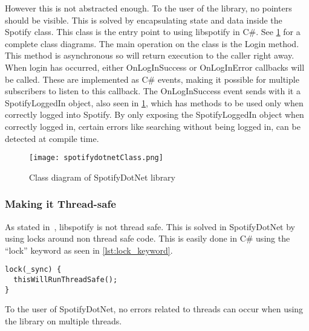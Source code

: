 However this is not abstracted enough. To the user of the library, no pointers should be visible. This is solved by encapsulating state and data inside the Spotify class. This class is the entry point to using libspotify in C\#. See \cref{fig:spotifydotnet_class} for a complete class diagrams. The main operation on the class is the Login method. This method is asynchronous so will return execution to the caller right away. When login has occurred, either OnLogInSuccess or OnLogInError callbacks will be called. These are implemented as C\# events, making it possible for multiple subscribers to listen to this callback. The OnLogInSuccess event sends with it a SpotifyLoggedIn object, also seen in \cref{fig:spotifydotnet_class}, which has methods to be used only when correctly logged into Spotify. By only exposing the SpotifyLoggedIn object when correctly logged in, certain errors like searching without being logged in, can be detected at compile time.

\begin{figure}
  \centering
  \texttt{[image: spotifydotnetClass.png]}
  \caption{Class diagram of SpotifyDotNet library}
  \label{fig:spotifydotnet_class}
\end{figure}

\subsubsection{Making it Thread-safe}
\label{ssub:making_it_thread_safe}

As stated in~\cite{spotifyLibspotifyFAQ}, libspotify is not thread safe. This is solved in SpotifyDotNet by using locks around non thread safe code. This is easily done in C\# using the \enquote{lock} keyword as seen in \cref{lst:lock_keyword}.

\begin{lstlisting}[caption = {Example of using the lock keyword in C\#. \enquote{\_sync} is an object used to store the lock state}, label = {lst:lock_keyword}]
lock(_sync) {
  thisWillRunThreadSafe();
}
\end{lstlisting}

To the user of SpotifyDotNet, no errors related to threads can occur when using the library on multiple threads.
